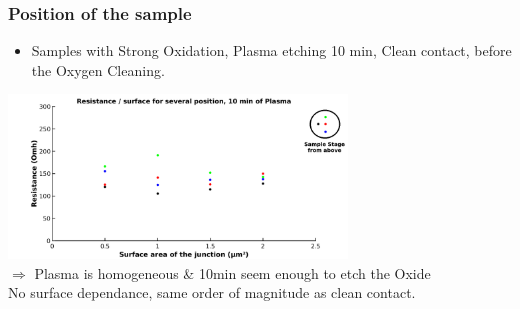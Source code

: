 \documentclass[handout]{beamer}
\begin{document}
    \begin{frame}
        \frametitle{Position of the sample}
        \begin{itemize}
            \item Samples with Strong Oxidation, Plasma etching 10 min, Clean contact, before the Oxygen Cleaning. 
        \end{itemize}

        \centering\includegraphics[width=90mm]{R_Position.png}\\
        $\Rightarrow$ {\small Plasma is homogeneous \& 10min seem enough to etch the Oxide\\No surface dependance, same order of magnitude as clean contact.}
    \end{frame}
     
\end{document}
